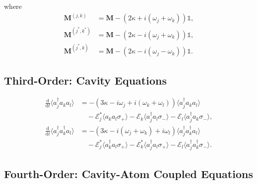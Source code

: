 \documentclass{article}
\newcommand{\ddt}[1][]{\frac{\mathrm{d} #1}{\mathrm{d}t}}
\begin{document}
where
\begin{subequations}
	\begin{align}
		\bm{M}^{(j, k)} &= \bm{M} - \left( 2 \kappa + i \left( \omega_{j} + \omega_{k} \right) \right) \mathbb{1}, \\
		\bm{M}^{(j^{*}, k^{*})} &= \bm{M} - \left( 2 \kappa - i \left( \omega_{j} + \omega_{k} \right) \right) \mathbb{1}, \\
		\bm{M}^{(j^{*}, k)} &= \bm{M} - \left( 2 \kappa - i \left( \omega_{j}- \omega_{k} \right) \right) \mathbb{1}.
	\end{align}
\end{subequations}

\subsection{Third-Order: Cavity Equations}

\begin{subequations}
	\begin{align}
		\ddt \langle a^{\dagger}_{j} a_{k} a_{l} \rangle &= -\left( 3 \kappa - i \omega_{j} + i \left( \omega_{k} + \omega_{l} \right) \right) \langle a^{\dagger}_{j} a_{k} a_{l} \rangle \nonumber \\
		&\quad - \mathcal{E}_{j}^{*} \langle a_{k} a_{l} \sigma_{+} \rangle - \mathcal{E}_{k} \langle a^{\dagger}_{j} a_{l} \sigma_{-} \rangle - \mathcal{E}_{l} \langle a^{\dagger}_{j} a_{k} \sigma_{-} \rangle , \\
		\ddt \langle a^{\dagger}_{j} a^{\dagger}_{k} a_{l} \rangle &= -\left( 3 \kappa - i \left( \omega_{j} + \omega_{k} \right) + i \omega_{l} \right) \langle a^{\dagger}_{j} a^{\dagger}_{k} a_{l} \rangle \nonumber \\
		&\quad - \mathcal{E}_{j}^{*} \langle a^{\dagger}_{k} a_{l} \sigma_{+} \rangle - \mathcal{E}_{k}^{*} \langle a^{\dagger}_{j} a_{l} \sigma_{+} \rangle - \mathcal{E}_{l} \langle a^{\dagger}_{j} a^{\dagger}_{k} \sigma_{-} \rangle .
	\end{align}
\end{subequations}

\subsection{Fourth-Order: Cavity-Atom Coupled Equations}
\end{document}
